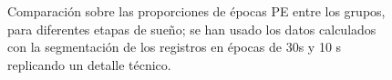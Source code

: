 \begin{figure}
\centering
{}\\
\\
\caption{Comparaci\'on sobre las proporciones de \'epocas PE entre los grupos, para diferentes
etapas de sue\~no; se han usado los datos calculados con la segmentaci\'on de los
registros en \'epocas de 30s y 10 s replicando un detalle t\'ecnico.}
\label{comparacion_graf_mixto}
\end{figure}


